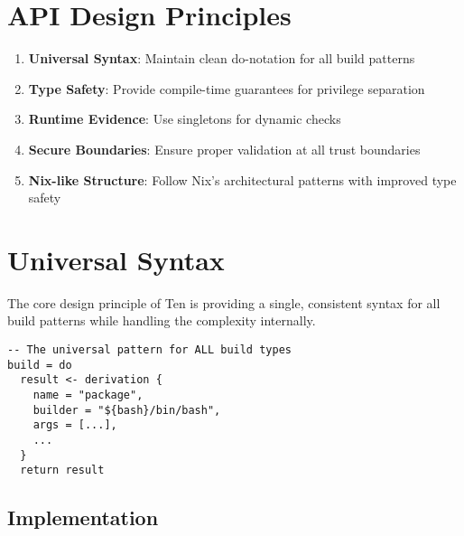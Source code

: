 \documentclass{article}
\begin{document}
\section{API Design Principles}

\begin{enumerate}
    \item \textbf{Universal Syntax}: Maintain clean do-notation for all build patterns
    \item \textbf{Type Safety}: Provide compile-time guarantees for privilege separation
    \item \textbf{Runtime Evidence}: Use singletons for dynamic checks
    \item \textbf{Secure Boundaries}: Ensure proper validation at all trust boundaries
    \item \textbf{Nix-like Structure}: Follow Nix's architectural patterns with improved type safety
\end{enumerate}

\newpage
\section{Universal Syntax}

The core design principle of Ten is providing a single, consistent syntax for all build patterns while handling the complexity internally.

\begin{tcolorbox}[title=Universal Syntax Pattern]
\begin{verbatim}
-- The universal pattern for ALL build types
build = do
  result <- derivation {
    name = "package",
    builder = "${bash}/bin/bash",
    args = [...],
    ...
  }
  return result
\end{verbatim}
\end{tcolorbox}

\subsection{Implementation}
\end{document}
